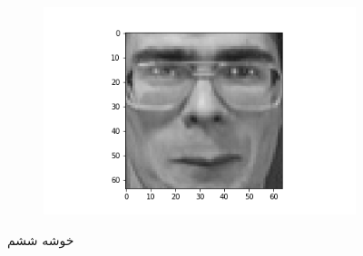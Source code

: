 \documentclass[12pt, a4paper]{article}
\begin{document}
\begin{figure}[h]
\begin{subfigure}{0.3\linewidth}
    \end{subfigure}
    \newline
    \hfill
    \begin{subfigure}{0.3\linewidth}
        \centering
        \includegraphics[width=\linewidth]{images/q3/c/5/9.png}
    \end{subfigure}
    \caption{خوشه ششم}
\end{figure}

\clearpage
\end{document}
